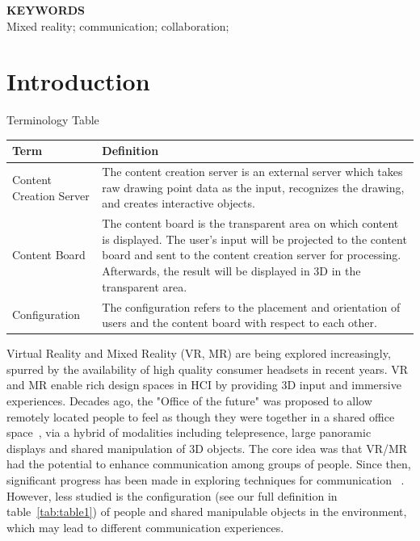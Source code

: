 \documentclass[sigchi-a]{acmart}
\begin{document}
\begin{margintable}
\vspace{1cm}
\flushleft
\textbf{KEYWORDS}\\
Mixed reality; communication; collaboration;
\end{margintable}
\maketitle





\section{Introduction}
\begin{margintable}
    \caption{Terminology Table}
    \label{tab:table1}
    \begin{tabular}{p{1.6cm} p{3.81cm}}
      \textbf{Term} &  \textbf{Definition}
      \\
      \toprule
      Content Creation Server & The content creation server is an external server which takes raw drawing point data as the input, recognizes the drawing, and creates interactive objects. \\
      Content Board & The content board is the transparent area on which content is displayed.
      The user's input will be projected to the content board and sent to the content creation server for processing. Afterwards, the result will be displayed in 3D in the transparent area.
      \\
      Configuration & The configuration refers to the placement and orientation of users and the content board with respect to each other. \\
      \bottomrule
    \end{tabular}
\end{margintable}

Virtual Reality and Mixed Reality (VR, MR) are being explored increasingly, spurred by the availability of high quality consumer headsets in recent years. VR and MR enable rich design spaces in HCI by providing 3D input and immersive experiences. Decades ago, the "Office of the future" was proposed to allow remotely located people to feel as though they were together in a shared office space~\cite{raskar1998office}, via a hybrid of modalities including telepresence, large panoramic displays and shared manipulation of 3D objects. The core idea was that VR/MR had the potential to enhance communication among groups of people. Since then, significant progress has been made in exploring techniques for communication ~\cite{ishii1993integration, otsuka2016mmspace}. However, less studied is the configuration (see our full definition in table~\ref{tab:table1}) of people and shared manipulable objects in the environment, which may lead to different communication experiences.
\end{document}
